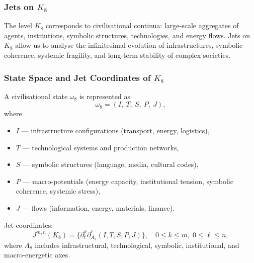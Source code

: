 
\subsubsection{Jets on \texorpdfstring{$K_8$}{K_8}}
\label{sec:jets-k8}

The level $K_8$ corresponds to civilisational continua: large-scale
aggregates of agents, institutions, symbolic structures, technologies,
and energy flows. Jets on $K_8$ allow us to analyse the infinitesimal
evolution of infrastructures, symbolic coherence, systemic fragility,
and long-term stability of complex societies.


\subsubsection{State Space and Jet Coordinates of \texorpdfstring{$K_8$}{K_8}}

A civilisational state $\omega_8$ is represented as
\[
\omega_8 =
(I,\ T,\ S,\ P,\ J),
\]
where
\begin{itemize}
    \item $I$ — infrastructure configurations (transport, energy, logistics),
    \item $T$ — technological systems and production networks,
    \item $S$ — symbolic structures (language, media, cultural codes),
    \item $P$ — macro-potentials (energy capacity, institutional tension,
                symbolic coherence, systemic stress),
    \item $J$ — flows (information, energy, materials, finance).
\end{itemize}

Jet coordinates:
\[
J^{m,n}(K_8)=
\{\partial_t^k \partial_{A_8}^\ell (I,T,S,P,J)\},
\quad
0\le k\le m,\;0\le\ell\le n,
\]
where $A_8$ includes infrastructural, technological, symbolic,
institutional, and macro-energetic axes.


